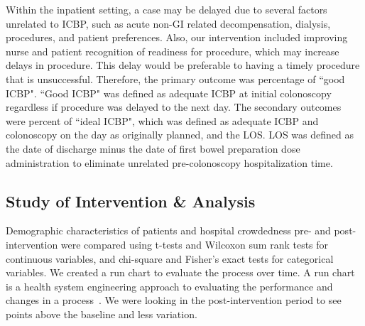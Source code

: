 \documentclass[Bprep]{subfiles}
\begin{document}
Within the inpatient setting, a case may be delayed due to several factors unrelated to ICBP, such as acute non-GI related decompensation, dialysis, procedures, and patient preferences. Also, our intervention included improving nurse and patient recognition of readiness for procedure, which may increase delays in procedure. This delay would be preferable to having a timely procedure that is unsuccessful. Therefore, the primary outcome was percentage of ``good ICBP". ``Good ICBP" was defined as adequate ICBP at initial colonoscopy regardless if procedure was delayed to the next day. The secondary outcomes were percent of ``ideal ICBP", which was defined as adequate ICBP and colonoscopy on the day as originally planned, and the
LOS. LOS was defined as the date of discharge minus the date of first bowel preparation dose administration to eliminate unrelated pre-colonoscopy hospitalization time.\\

\subsection{Study of Intervention \& Analysis}\label{subsec:SoIA}
\hypertarget{Study of Intervention \& Analysis}{}

Demographic characteristics of patients and hospital crowdedness pre- and post-intervention were compared using t-tests and Wilcoxon sum rank tests for continuous variables, and chi-square and Fisher's exact tests for categorical variables. We created a run chart to evaluate the process over time. A run chart is a health system engineering approach to evaluating the performance and changes in a process~\cite{Perla2011-dp}. We were looking in the post-intervention period to see points above the baseline and less variation.\\
\end{document}
